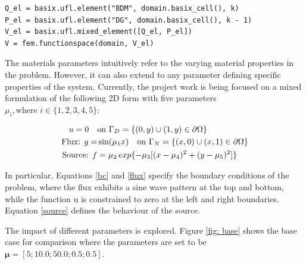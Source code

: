 \begin{lstlisting}[frame=single, caption={Defining geometric parameters / Creating Function Space }]
Q_el = basix.ufl.element("BDM", domain.basix_cell(), k)
P_el = basix.ufl.element("DG", domain.basix_cell(), k - 1)
V_el = basix.ufl.mixed_element([Q_el, P_el])
V = fem.functionspace(domain, V_el)
\end{lstlisting}

The materials parameters intuitively refer to the varying material properties in the problem. However, it can also extend to any parameter defining specific properties of the system, Currently, the project work is being focused on a mixed formulation of the following 2D form with five parameters $\mu_i, \text{where } i \in \{1, 2, 3, 4, 5\}$: 

\begin{align}
    u = 0 \quad & {\rm on} \ \Gamma_{D} = \{(0, y) \cup (1, y) \in \partial \Omega\} \label{bc} \\
    \text{Flux: }  g = & \sin(\mu_1 x)  \quad {\rm on} \ \Gamma_{N} = \{(x, 0) \cup (x, 1) \in \partial \Omega\} \label{flux} \\   
    \text{Source: } f & = \mu_2 \, exp\{-\mu_3[(x-\mu_4)^2 + (y-\mu_5)^2]\}  \label{source}
\end{align}

In particular, Equations \ref{bc} and \ref{flux} specify the boundary conditions of the problem, where the flux exhibits a sine wave pattern at the top and bottom, while the function u is constrained to zero at the left and right boundaries.
Equation \ref{source} defines the behaviour of the source.

The impact of different parameters is explored. Figure \ref{fig: base} shows the base case for comparison where the parameters are set to be $\bm{\mu} = [5; 10.0; 50.0; 0.5; 0.5]$.

